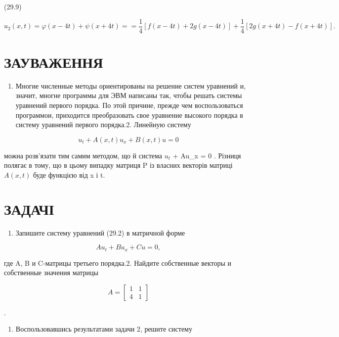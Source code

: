 \documentclass[
  ukrainian,
]{article}
\providecommand{\tightlist}{%
  \setlength{\itemsep}{0pt}\setlength{\parskip}{0pt}}
\begin{document}
(29.9)

\[
u_{2}(x, t) = \varphi(x-4t) + \psi(x+4t) =
= \frac{1}{4} \left[ f(x-4t) + 2g(x-4t) \right] + \frac{1}{4} \left[ 2g(x+4t) - f(x+4t) \right].
\]

\section{ЗАУВАЖЕННЯ}\label{ux437ux430ux443ux432ux430ux436ux435ux43dux43dux44f-1}

\begin{enumerate}
\def\labelenumi{\arabic{enumi}.}
\tightlist
\item
  Многие численные методы ориентированы на решение систем уравнений и,
  значит, многне программы для ЭВМ написаны так, чтобы решать системы
  уравнений первого порядка. По этой причине, прежде чем воспользоваться
  программои, приходится преобразовать свое уравнение высокого порядка в
  систему уравнений первого порядка.2. Линейную систему
\end{enumerate}

\[
u_t + A(x, t) u_x + B(x, t) u = 0
\]

можна розв'язати тим самим методом, що й система \(u_t\) + Au\_x = 0 .
Різниця полягає в тому, що в цьому випадку матриця P із власних векторів
матриці \(A(x, t)\) буде функцією від x і t.

\section{ЗАДАЧІ}\label{ux437ux430ux434ux430ux447ux456}

\begin{enumerate}
\def\labelenumi{\arabic{enumi}.}
\tightlist
\item
  Запишите систему уравнений (29.2) в матричной форме
\end{enumerate}

\[
Au_t + Bu_x + Cu = 0,
\]

где A, B и C-матрицы третьего порядка.2. Найдите собственные векторы и
собственные значения матрицы

\[
A =
\begin{bmatrix} 1 & 1 \\ 4 & 1 \end{bmatrix}
\]

.

\begin{enumerate}
\def\labelenumi{\arabic{enumi}.}
\setcounter{enumi}{2}
\tightlist
\item
  Воспользовавшись результатами задачи 2, решите систему
\end{enumerate}
\end{document}
